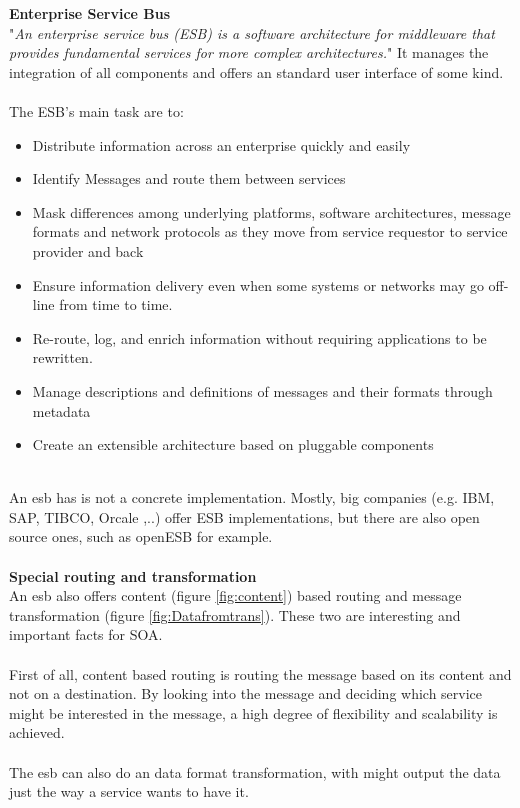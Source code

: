 \documentclass[12pt]{article}
\begin{document}
\FloatBarrier  \noindent
\textbf{Enterprise Service Bus} \\
"\textit{An enterprise service bus (ESB) is a software architecture for middleware that provides fundamental services for more complex architectures.}" \cite{esbdef} 
It manages the integration of all components and offers an standard user interface of some kind. \cite{esbdef}\\
\\The ESB's main task are to:
\begin{itemize}
\item Distribute information across an enterprise quickly and easily
\item Identify Messages and route them between services
\item Mask differences among underlying platforms, software architectures, message formats and network protocols as they move from service requestor to service provider and back
\item Ensure information delivery even when some systems or networks may go off-line from time to time.
\item Re-route, log, and enrich information without requiring applications to be rewritten.
\item Manage descriptions and definitions of messages and their formats through metadata
\item Create an extensible architecture based on pluggable components
\end{itemize} \cite{esbdef,esbimplpatt} \\
An \gls{esb} has is not a concrete implementation. Mostly, big companies (e.g. IBM, SAP, TIBCO, Orcale ,..) offer ESB implementations, but there are also open source ones, such as openESB for example.
\\\\
\textbf{Special routing and transformation} \\
An \gls{esb} also offers content (figure \ref{fig:content}) %
based  routing and message transformation (figure \ref{fig:Datafromtrans}). These two are interesting and important facts for SOA.\\\\
First of all, content based routing is routing the message based on its content and not on a destination. By looking into the message and deciding which service might be interested in the message, a high degree of flexibility and scalability is achieved.\\ %
\\The esb can also do an data format transformation, with might output the data just the way a service wants to have it.
\end{document}
